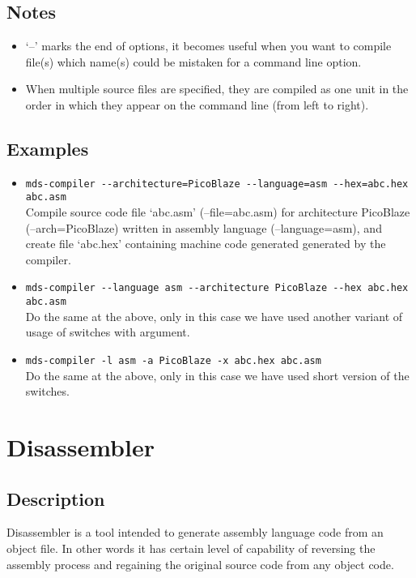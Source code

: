     \subsection{Notes}
        \begin{itemize}
            \item `--' marks the end of options, it becomes useful when you want to compile file(s) which name(s) could be mistaken for a command line option.
            \item When multiple source files are specified, they are compiled as one unit in the order in which they appear on the command line (from left to right).
        \end{itemize}

    \subsection{Examples}
        \begin{itemize}
            \item \verb'mds-compiler --architecture=PicoBlaze --language=asm --hex=abc.hex abc.asm'\\
                Compile source code file `abc.asm' (--file=abc.asm) for architecture PicoBlaze (--arch=PicoBlaze) written in assembly language (--language=asm), and create file `abc.hex' containing machine code generated generated by the compiler.

            \item \verb'mds-compiler --language asm --architecture PicoBlaze --hex abc.hex abc.asm'\\
                Do the same at the above, only in this case we have used another variant of usage of switches with argument.

            \item \verb'mds-compiler -l asm -a PicoBlaze -x abc.hex abc.asm'\\
                Do the same at the above, only in this case we have used short version of the switches.
        \end{itemize}

\section{Disassembler}
    \subsection{Description}
        Disassembler is a tool intended to generate assembly language code from an object file. In other words it has certain level of capability of reversing the assembly process and regaining the original source code from any object code.

